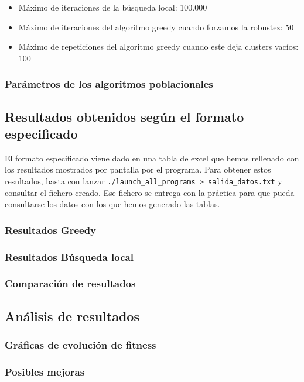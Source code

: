 \documentclass[11pt]{article}
\begin{document}
\begin{itemize}
    \item Máximo de iteraciones de la búsqueda local: 100.000
    \item Máximo de iteraciones del algoritmo greedy cuando forzamos la robustez: 50
    \item Máximo de repeticiones del algoritmo greedy cuando este deja clusters vacíos: 100
\end{itemize}

\subsubsection{Parámetros de los algoritmos poblacionales} \label{section:parametros_poblacionales}


\pagebreak

\subsection{Resultados obtenidos según el formato especificado}

El formato especificado viene dado en una tabla de excel que hemos rellenado con los resultados mostrados por pantalla por el programa. Para obtener estos resultados, basta con lanzar \lstinline{./launch_all_programs > salida_datos.txt} y consultar el fichero creado. Ese fichero se entrega con la práctica para que pueda consultarse los datos con los que hemos generado las tablas.

\subsubsection{Resultados Greedy}

\subsubsection{Resultados Búsqueda local}

\subsubsection{Comparación de resultados}


\subsection{Análisis de resultados}

\subsubsection{Gráficas de evolución de fitness}

\subsubsection{Posibles mejoras}
\end{document}

